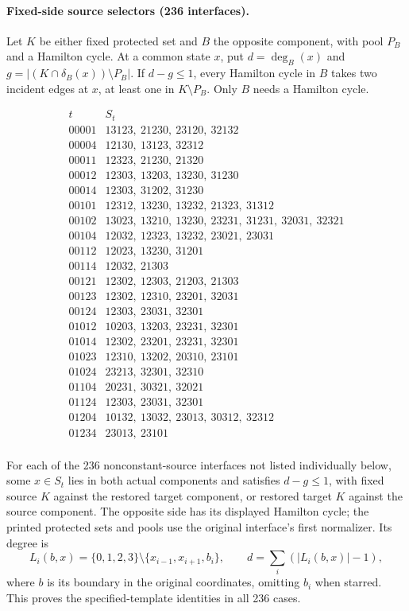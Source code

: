 \paragraph{Fixed-side source selectors (236 interfaces).}
Let $K$ be either fixed protected set and $B$ the opposite component,
with pool $P_B$ and a Hamilton cycle. At a common state $x$, put
$d=\deg_B(x)$ and $g=|(K\cap\delta_B(x))\setminus P_B|$.
If $d-g\le1$, every Hamilton cycle in $B$ takes two incident edges
at $x$, at least one in $K\setminus P_B$. Only $B$ needs a Hamilton cycle.

\[\begin{array}{c|l}t&S_t\\\hline
00001&13123,\ 21230,\ 23120,\ 32132\\
00004&12130,\ 13123,\ 32312\\
00011&12323,\ 21230,\ 21320\\
00012&12303,\ 13203,\ 13230,\ 31230\\
00014&12303,\ 31202,\ 31230\\
00101&12312,\ 13230,\ 13232,\ 21323,\ 31312\\
00102&13023,\ 13210,\ 13230,\ 23231,\ 31231,\ 32031,\ 32321\\
00104&12032,\ 12323,\ 13232,\ 23021,\ 23031\\
00112&12023,\ 13230,\ 31201\\
00114&12032,\ 21303\\
00121&12302,\ 12303,\ 21203,\ 21303\\
00123&12302,\ 12310,\ 23201,\ 32031\\
00124&12303,\ 23031,\ 32301\\
01012&10203,\ 13203,\ 23231,\ 32301\\
01014&12302,\ 23201,\ 23231,\ 32301\\
01023&12310,\ 13202,\ 20310,\ 23101\\
01024&23213,\ 32301,\ 32310\\
01104&20231,\ 30321,\ 32021\\
01124&12303,\ 23031,\ 32301\\
01204&10132,\ 13032,\ 23013,\ 30312,\ 32312\\
01234&23013,\ 23101\\
\end{array}\]


For each of the 236 nonconstant-source interfaces not listed individually
below, some $x\in S_t$ lies in both actual components and satisfies
$d-g\le1$, with fixed source $K$ against the restored target component,
or restored target $K$ against the source component. The opposite side
has its displayed Hamilton cycle; the printed protected sets and pools
use the original interface's first normalizer. Its degree is
\[
L_i(b,x)=\{0,1,2,3\}\setminus\{x_{i-1},x_{i+1},b_i\},\qquad
d=\sum_i(|L_i(b,x)|-1),
\]
where $b$ is its boundary in the original coordinates, omitting $b_i$
when starred. This proves the specified-template identities in all 236 cases.

